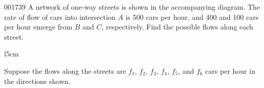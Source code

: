 \begin{example}{}{001739}
A network of one-way streets is shown in the accompanying diagram. The rate of flow of cars into intersection $A$ is 500 cars per hour, and 400 and 100 cars per hour emerge from $B$ and $C$, respectively. Find the possible flows along each street.

\begin{wrapfigure}[7]{l}{5cm} 
	
\end{wrapfigure}

\setlength{\rightskip}{0pt plus 200pt}
\begin{solution}
Suppose the flows along the streets are $ f_1$, $f_2$, $f_3$, $f_4$, $f_5$, and $f_6$ cars per hour in the directions shown. 


\end{solution}
\end{example}
